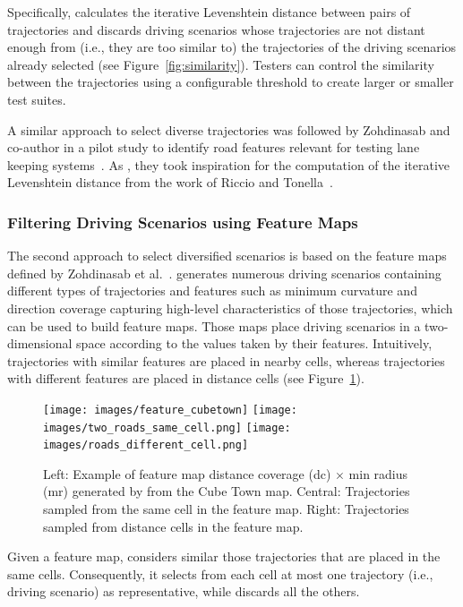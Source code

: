 \documentclass[conference]{IEEEtran}
\begin{document}
Specifically, \tool calculates the iterative Levenshtein distance between pairs of trajectories and discards driving scenarios whose trajectories are not distant enough from (i.e., they are too similar to) the trajectories of the driving scenarios already selected (see Figure~\ref{fig:similarity}).
%
Testers can control the similarity between the trajectories using a configurable threshold to create larger or smaller test suites. 


A similar approach to select diverse trajectories was followed by Zohdinasab and co-author in a pilot study to identify road features relevant for testing lane keeping systems~\cite{zohdinasab2021deephyperion}.
As \tool, they took inspiration for the computation of the iterative Levenshtein distance from the work of Riccio and Tonella~\cite{DBLP:conf/sigsoft/RiccioT20}.

\subsubsection{Filtering Driving Scenarios using Feature Maps}
The second approach to select diversified scenarios is based on the feature maps defined by Zohdinasab et al.~\cite{zohdinasab2021deephyperion}. 
%
\tool generates numerous driving scenarios containing different types of trajectories and features such as minimum curvature and direction coverage capturing high-level characteristics of those trajectories, which can be used to build feature maps. Those maps place driving scenarios in a two-dimensional space according to the values taken by their features.
%
Intuitively, trajectories with similar features are placed in nearby cells, whereas trajectories with different features are placed in distance cells (see Figure~\ref{fig:feature-maps}).

\begin{figure}[t]
\texttt{[image: images/feature\_cubetown]}
\endminipage\hfill
{}
\texttt{[image: images/two\_roads\_same\_cell.png]}
\endminipage\hfill
{}%
  \texttt{[image: images/roads\_different\_cell.png]}
\endminipage
\caption{Left: Example of feature map distance coverage (dc) $\times$ min radius (mr) generated by \tool from the Cube Town map. Central: Trajectories sampled from the same cell in the feature map. Right: Trajectories sampled from distance cells in the feature map.}
\label{fig:feature-maps}
\end{figure}

Given a feature map, \tool considers similar those trajectories that are placed in the same cells. Consequently, it selects from each cell at most one trajectory (i.e., driving scenario) as representative, while discards all the others.
\end{document}
